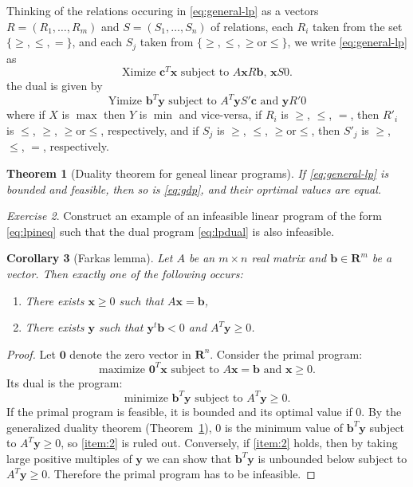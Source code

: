 \documentclass{amsbook}
\newcommand{\xx}{\mathbf x}
\newcommand{\yy}{\mathbf y}
\newcommand{\cc}{\mathbf c}
\newcommand{\bb}{\mathbf b}
\newcommand{\RR}{\mathbf R}
\newtheorem{theorem}{Theorem}[section]
\newtheorem{corollary}[theorem]{Corollary}
\theoremstyle{definition}
\theoremstyle{remark}
\newtheorem{exercise}[theorem]{Exercise}
\begin{document}
Thinking of the relations occuring in \eqref{eq:general-lp} as a vectors $R=(R_1,\dotsc,R_m)$ and $S=(S_1,\dotsc,S_n)$ of relations, each $R_i$ taken from the set $\{\geq,\leq,=\}$, and each $S_j$ taken from $\{\geq,\leq,\geq\text{or}\leq\}$, we write \eqref{eq:general-lp} as
\begin{equation}
  \tag{GLP}
  \text{Ximize $\cc^T\xx$ subject to $A\xx R \bb$, $\xx S0$}.
\end{equation}
the dual is given by
\begin{equation}
  \label{eq:gdp}
  \tag{GDP}
  \text{Yimize $\bb^T\yy$ subject to $A^T\yy S' \cc$ and $\yy R' 0$}
\end{equation}
where if $X$ is $\max$ then $Y$ is $\min$ and vice-versa, if $R_i$ is $\geq$, $\leq$, $=$, then $R'_i$ is $\leq$, $\geq$, $\geq\text{or}\leq$, respectively, and if $S_j$ is $\geq$, $\leq$, $\geq\text{or}\leq$, then $S'_j$ is $\geq$, $\leq$, $=$, respectively.
\begin{theorem}
  [Duality theorem for geneal linear programs]
  \label{theorem:gen-dual}
  If \eqref{eq:general-lp} is bounded and feasible, then so is \eqref{eq:gdp}, and their oprtimal values are equal.
\end{theorem}
\begin{exercise}
  Construct an example of an infeasible linear program of the form \eqref{eq:lpineq} such that the dual program \eqref{eq:lpdual} is also infeasible.
\end{exercise}
\begin{corollary}
  [Farkas lemma]
  Let $A$ be an $m\times n$ real matrix and $\bb\in \RR^m$ be a vector.
  Then exactly one of the following occurs:
  \begin{enumerate}
  \item \label{item:1} There exists $\xx\geq 0$ such that $A\xx=\bb$,
  \item \label{item:2} There exists $\yy$ such that $\yy^t\bb<0$ and $A^T\yy\geq 0$.
  \end{enumerate}
\end{corollary}
\begin{proof}
  Let $\mathbf 0$ denote the zero vector in $\RR^n$.
  Consider the primal program:
  \begin{displaymath}
    \text{maximize $\mathbf 0^T\xx$ subject to $A\xx=\bb$ and $\xx\geq 0$}.
  \end{displaymath}
  Its dual is the program:
  \begin{displaymath}
    \text{minimize $\bb^T\yy$ subject to $A^T\yy\geq 0$.}
  \end{displaymath}
  If the primal program is feasible, it is bounded and its optimal value if $0$.
  By the generalized duality theorem (Theorem~\ref{theorem:gen-dual}), $0$ is the minimum value of $\bb^T\yy$ subject to $A^T\yy\geq 0$, so \eqref{item:2} is ruled out.
  Conversely, if \eqref{item:2} holds, then by taking large positive multiples of $\yy$ we can show that $\bb^T\yy$ is unbounded below subject to $A^T\yy\geq 0$.
  Therefore the primal program has to be infeasible.
\end{proof}
\end{document}
